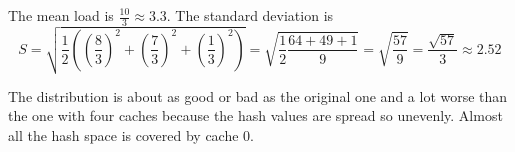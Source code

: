 \documentclass[10pt,a4paper]{article}
\begin{document}
The mean load is $\frac{10}{3} \approx 3.3$.
The standard deviation is
\begin{equation*}
  S = \sqrt{\frac{1}{2} \left( \left(\frac{8}{3}\right)^{2} + \left( \frac{7}{3} \right)^{2} + \left( \frac{1}{3} \right)^{2} \right)} = \sqrt{\frac{1}{2} \frac{64 + 49 + 1}{9}} = \sqrt{\frac{57}{9}} = \frac{\sqrt{57}}{3} \approx 2.52
\end{equation*}

The distribution is about as good or bad as the original one and a lot worse than the one with four caches because the hash values are spread so unevenly.
Almost all the hash space is covered by cache 0.
\end{document}
